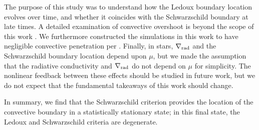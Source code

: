 The purpose of this study was to understand how the Ledoux boundary location evolves over time, and whether it coincides with the Schwarzschild boundary at late times.
A detailed examination of convective overshoot is beyond the scope of this work \citep[but see e.g.,][]{korre_etal_2019}.
We furthermore constructed the simulations in this work to have negligible convective penetration per \citet{anders_etal_2022}.
Finally, in stars, $\nabla_{\rm{rad}}$ and the Schwarzschild boundary location depend upon $\mu$, but we made the assumption that the radiative conductivity and $\nabla_{\rm{rad}}$ do not depend on $\mu$ for simplicity.
The nonlinear feedback between these effects should be studied in future work, but we do not expect that the fundamental takeaways of this work should change.

In summary, we find that the Schwarzschild criterion provides the location of the convective boundary in a statistically stationary state; in this final state, the Ledoux and Schwarzschild criteria are degenerate.

